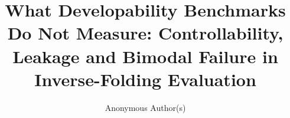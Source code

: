 \documentclass{article}
\title{What Developability Benchmarks Do Not Measure: Controllability,
Leakage and Bimodal Failure in Inverse-Folding Evaluation}
\author{Anonymous Author(s)}
\begin{document}
\maketitle









\label{endofbody}








\end{document}
